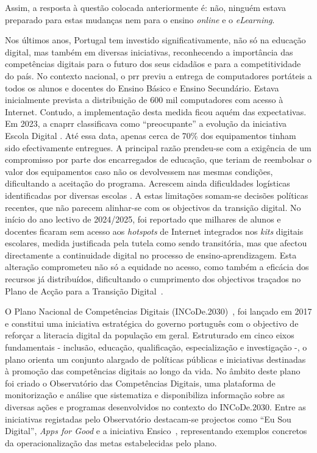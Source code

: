 Assim, a resposta à questão colocada anteriormente é: não, ninguém estava preparado para estas mudanças nem para o ensino \textit{online} e o \textit{eLearning}.

Nos últimos anos, Portugal tem investido significativamente, não só na educação digital, mas também em diversas iniciativas, reconhecendo a importância das competências digitais para o futuro dos seus cidadãos e para a competitividade do país. No contexto nacional, o \acrfull{prr} previu a entrega de computadores portáteis a todos os alunos e docentes do Ensino Básico e Ensino Secundário. Estava inicialmente prevista a distribuição de 600 mil computadores com acesso à Internet. Contudo, a implementação desta medida ficou aquém das expectativas. Em 2023, a \acrfull{cnaprr} classificava como ``preocupante'' a evolução da iniciativa Escola Digital \cite{PRREntregacomputadores}. Até essa data, apenas cerca de 70\% dos equipamentos tinham sido efectivamente entregues. A principal razão prendeu-se com a exigência de um compromisso por parte dos encarregados de educação, que teriam de reembolsar o valor dos equipamentos caso não os devolvessem nas mesmas condições, dificultando a aceitação do programa. Acrescem ainda dificuldades logísticas identificadas por diversas escolas \cite{PRREntregacomputadores}. A estas limitações somam-se decisões políticas recentes, que não parecem alinhar-se com os objectivos da transição digital. No início do ano lectivo de 2024/2025, foi reportado que milhares de alunos e docentes ficaram sem acesso aos \textit{hotspots} de Internet integrados nos \textit{kits} digitais escolares, medida justificada pela tutela como sendo transitória, mas que afectou directamente a continuidade digital no processo de ensino-aprendizagem. Esta alteração comprometeu não só a equidade no acesso, como também a eficácia dos recursos já distribuídos, dificultando o cumprimento dos objectivos traçados no Plano de Acção para a Transição Digital~\cite{ExecutiveDigest2024}.

O Plano Nacional de Competências Digitais (INCoDe.2030)~\cite{incode2030}, foi lançado em 2017 e constitui uma iniciativa estratégica do governo português com o objectivo de reforçar a literacia digital da população em geral. Estruturado em cinco eixos fundamentais - inclusão, educação, qualificação, especialização e investigação -, o plano orienta um conjunto alargado de políticas públicas e iniciativas destinadas à promoção das competências digitais ao longo da vida. No âmbito deste plano foi criado o Observatório das Competências Digitais, uma plataforma de monitorização e análise que sistematiza e disponibiliza informação sobre as diversas ações e programas desenvolvidos no contexto do INCoDe.2030. Entre as iniciativas registadas pelo Observatório destacam-se projectos como ``Eu Sou Digital'', \textit{Apps for Good} e a iniciativa Ensico~\cite{observatorio2030}, representando exemplos concretos da operacionalização das metas estabelecidas pelo plano.

